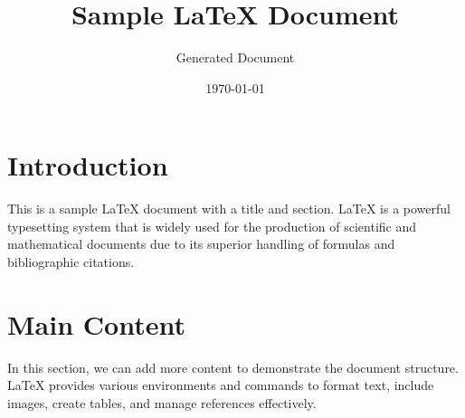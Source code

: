 \documentclass{article}
\title{Sample LaTeX Document}
\author{Generated Document}
\date{\today}
\begin{document}
\maketitle

\section{Introduction}
This is a sample LaTeX document with a title and section. LaTeX is a powerful typesetting system that is widely used for the production of scientific and mathematical documents due to its superior handling of formulas and bibliographic citations.

\section{Main Content}
In this section, we can add more content to demonstrate the document structure. LaTeX provides various environments and commands to format text, include images, create tables, and manage references effectively.
\end{document}
